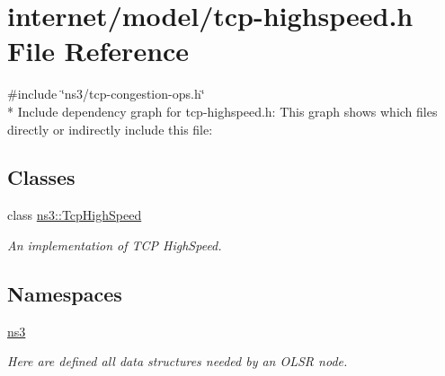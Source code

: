 \hypertarget{tcp-highspeed_8h}{}\section{internet/model/tcp-\/highspeed.h File Reference}
\label{tcp-highspeed_8h}
{\ttfamily \#include \char`\"{}ns3/tcp-\/congestion-\/ops.\+h\char`\"{}}\\*
Include dependency graph for tcp-\/highspeed.h\+:
This graph shows which files directly or indirectly include this file\+:
\subsection*{Classes}
\begin{DoxyCompactItemize}
\item 
class \hyperlink{classns3_1_1TcpHighSpeed}{ns3\+::\+Tcp\+High\+Speed}
\begin{DoxyCompactList}\small\item\em An implementation of T\+CP High\+Speed. \end{DoxyCompactList}\end{DoxyCompactItemize}
\subsection*{Namespaces}
\begin{DoxyCompactItemize}
\item 
 \hyperlink{namespacens3}{ns3}
\begin{DoxyCompactList}\small\item\em Here are defined all data structures needed by an O\+L\+SR node. \end{DoxyCompactList}\end{DoxyCompactItemize}
